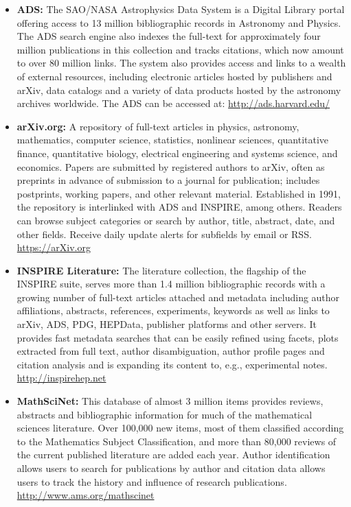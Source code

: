 \begin{itemize}
\item
  \textbf{ADS:} The SAO/NASA Astrophysics Data System is a Digital
  Library portal offering access to 13 million bibliographic records in
  Astronomy and Physics. The ADS search engine also indexes the
  full-text for approximately four million publications in this
  collection and tracks citations, which now amount to over 80 million
  links. The system also provides access and links to a wealth of
  external resources, including electronic articles hosted by publishers
  and arXiv, data catalogs and a variety of data products hosted by the
  astronomy archives worldwide. The ADS can be accessed at:
  \url{http://ads.harvard.edu/}
\item
  \textbf{arXiv.org:} A repository of full-text articles in physics,
  astronomy, mathematics, computer science, statistics, nonlinear
  sciences, quantitative finance, quantitative biology, electrical
  engineering and systems science, and economics. Papers are submitted
  by registered authors to arXiv, often as preprints in advance of
  submission to a journal for publication; includes postprints, working
  papers, and other relevant material. Established in 1991, the
  repository is interlinked with ADS and INSPIRE, among others. Readers
  can browse subject categories or search by author, title, abstract,
  date, and other fields. Receive daily update alerts for subfields by
  email or RSS. \url{https://arXiv.org}

\item
  \textbf{INSPIRE Literature:} The literature collection, the flagship of the INSPIRE
  suite, serves more than 1.4 million bibliographic records with a
  growing number of full-text articles attached and metadata including
  author affiliations, abstracts, references, experiments, keywords as
  well as links to arXiv, ADS, PDG, HEPData, publisher platforms and
  other servers. It provides fast metadata searches that can be easily refined using facets, plots
  extracted from full text, author disambiguation, author profile pages
  and citation analysis and is expanding its content to, e.g.,
  experimental notes. \url{http://inspirehep.net}
\item
  \textbf{MathSciNet:} This database of almost 3 million items provides
  reviews, abstracts and bibliographic information for much of the
  mathematical sciences literature. Over 100,000 new items, most of them
  classified according to the Mathematics Subject Classification, and
  more than 80,000 reviews of the current published literature are added
  each year. Author identification allows users to search for
  publications by author and citation data allows users to track the
  history and influence of research publications.
  \url{http://www.ams.org/mathscinet}
\end{itemize}

